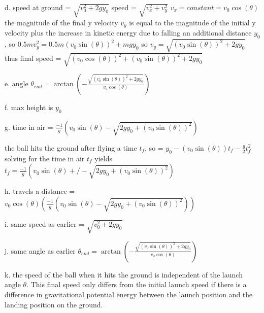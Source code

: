 d. speed at ground = $\sqrt{v_{0}^{2} + 2gy_{0}}$\newline
speed = $\sqrt{v_{x}^{2} + v_{y}^{2}}$\newline
$v_{x} = constant = v_{0}\cos(\theta)$\newline
the magnitude of the final y velocity $v_{y}$ is equal\newline
to the magnitude of the initial y velocity plus the\newline
increase in kinetic energy due to falling an additional\newline
distance $y_{0}$, so\newline
$0.5mv_{y}^{2} = 0.5m(v_{0}\sin(\theta))^{2} + mgy_{0}$\newline
so $v_{y} = \sqrt{(v_{0}\sin(\theta))^{2} + 2gy_{0}}$\newline
thus final speed = $\sqrt{(v_{0}\cos(\theta))^{2} + (v_{0}\sin(\theta))^{2} + 2gy_{0}}$\newline

e. angle $\theta_{end} = \arctan(-\frac{\sqrt{(v_{0}\sin(\theta))^{2} + 2gy_{0}}}{v_{0}\cos(\theta)})$\newline

f. max height is $y_{0}$\newline

g. time in air = $\frac{-1}{g}(v_{0}\sin(\theta) - \sqrt{2gy_{0} + (v_{0}\sin(\theta))^{2}})$\newline

the ball hits the ground after flying a time $t_{f}$, so = $y_{0} - (v_{0}\sin(\theta))t_{f} - \frac{g}{2}t_{f}^{2}$\newline
solving for the time in air $t_{f}$ yields\newline
$t_{f} = \frac{-1}{g}(v_{0}\sin(\theta) +/- \sqrt{2gy_{0} + (v_{0}\sin(\theta))^{2}})$\newline

h. travels a distance = $v_{0}\cos(\theta)(\frac{-1}{g}(v_{0}\sin(\theta) - \sqrt{2gy_{0} + (v_{0}\sin(\theta))^{2}}))$\newline

i. same speed as earlier = $\sqrt{v_{0}^{2} + 2gy_{0}}$\newline

j. same angle as earlier $\theta_{end} = \arctan(-\frac{\sqrt{(v_{0}\sin(\theta))^{2} + 2gy_{0}}}{v_{0}\cos(\theta)})$\newline

k. the speed of the ball when it hits the ground is\newline
independent of the launch angle $\theta$. This final\newline
speed only differs from the initial launch speed if\newline
there is a difference in gravitational potential energy\newline
between the launch position and the landing position\newline
on the ground.\newline

